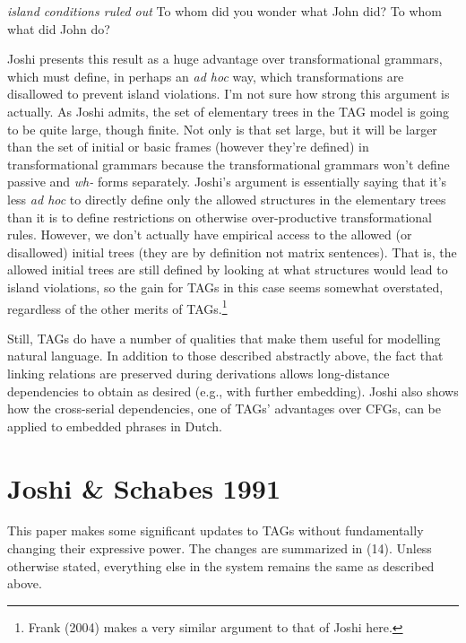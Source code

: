 \documentclass[12pt]{article}
\begin{document}
\pex \textit{island conditions ruled out}
\a * To whom did you wonder what John did?
\a * To whom what did John do?
\xe

Joshi presents this result as a huge advantage over transformational grammars, which must define, in perhaps an \textit{ad hoc} way, which transformations are disallowed to prevent island violations. I'm not sure how strong this argument is actually. As Joshi admits, the set of elementary trees in the TAG model is going to be quite large, though finite. Not only is that set large, but it will be larger than the set of initial or basic frames (however they're defined) in transformational grammars because the transformational grammars won't define passive and \textit{wh-} forms separately. Joshi's argument is essentially saying that it's less \textit{ad hoc} to directly define only the allowed structures in the elementary trees than it is to define restrictions on otherwise over-productive transformational rules. However, we don't actually have empirical access to the allowed (or disallowed) initial trees (they are by definition not matrix sentences). That is, the allowed initial trees are still defined by looking at what structures would lead to island violations, so the gain for TAGs in this case seems somewhat overstated, regardless of the other merits of TAGs.\footnote{Frank (2004) makes a very similar argument to that of Joshi here.}

Still, TAGs do have a number of qualities that make them useful for modelling natural language. In addition to those described abstractly above, the fact that linking relations are preserved during derivations allows long-distance dependencies to obtain as desired (e.g., with further embedding). Joshi also shows how the cross-serial dependencies, one of TAGs' advantages over CFGs, can be applied to embedded phrases in Dutch.

\section{Joshi \& Schabes 1991}

This paper makes some significant updates to TAGs without fundamentally changing their expressive power. The changes are summarized in (14). Unless otherwise stated, everything else in the system remains the same as described above.
\end{document}
